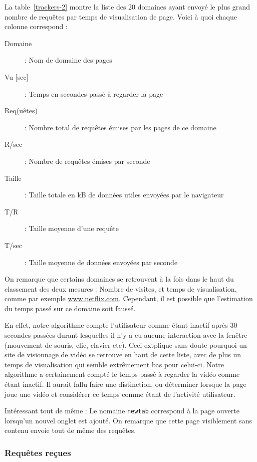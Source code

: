 			La table~\ref{trackers-2} montre la liste des 20 domaines ayant envoyé le plus grand nombre de requêtes par temps de visualisation de page. Voici à quoi chaque colonne correspond :
			\begin{description}
				\item[Domaine] : Nom de domaine des pages
				\item[Vu {[}sec{]}] : Temps en secondes passé à regarder la page
				\item[Req(uêtes)] : Nombre total de requêtes émises par les pages de ce domaine
				\item[R/sec] : Nombre de requêtes émises par seconde
				\item[Taille] : Taille totale en kB de données utiles envoyées par le navigateur
				\item[T/R] : Taille moyenne d'une requête
				\item[T/sec] : Taille moyenne de données envoyées par seconde
			\end{description}

			On remarque que certains domaines se retrouvent à la fois dans le haut du classement des deux mesures : Nombre de visites, et temps de visualisation, comme par exemple \url{www.netflix.com}. Cependant, il est possible que l'estimation du temps passé sur ce domaine soit faussé.

			En effet, notre algorithme compte l'utilisateur comme étant inactif après 30 secondes passées durant lesquelles il n'y a eu aucune interaction avec la fenêtre (mouvement de souris, clic, clavier etc). Ceci extplique sans doute pourquoi un site de visionnage de vidéo se retrouve en haut de cette liste, avec de plus un temps de visualisation qui semble extrêmement bas pour celui-ci. Notre algorithme a certainement compté le temps passé à regarder la vidéo comme étant inactif. Il aurait fallu faire une distinction, ou déterminer lorsque la page joue une vidéo et considérer ce temps comme étant de l'activité utilisateur.

			Intéressant tout de même : Le nomaine \texttt{newtab} correspond à la page ouverte lorsqu'un nouvel onglet est ajouté. On remarque que cette page visiblement sans contenu envoie tout de même des requêtes.

		\newpage

		\FloatBarrier

		\subsubsection{Requêtes reçues}

